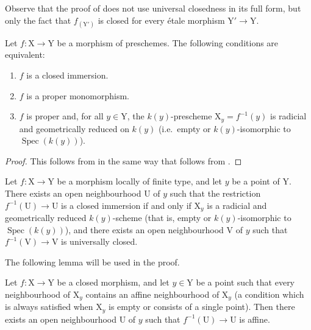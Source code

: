 \begin{remark}[18.12.5]
\label{IV.18.12.5}
Observe that the proof of  does not use universal closedness in its full form, but only the fact that $f_{(\mathrm{Y}')}$ is closed for every \'etale morphism $\mathrm{Y}'\to\mathrm{Y}$.
\end{remark}

\begin{corollary}[18.12.6]
\label{IV.18.12.6}
Let $f:\mathrm{X}\to\mathrm{Y}$ be a morphism of preschemes.
The following conditions are equivalent:
\begin{enumerate}[label=\alph*)]
  \item $f$ is a closed immersion.
  \item $f$ is a proper monomorphism.
  \item $f$ is proper and, for all $y\in\mathrm{Y}$, the $k(y)$-prescheme $\mathrm{X}_y=f^{-1}(y)$ is radicial and geometrically reduced on $k(y)$ (i.e.\ empty or $k(y)$-isomorphic to $\operatorname{Spec}(k(y))$).
\end{enumerate}
\end{corollary}

\begin{proof}
This follows from  in the same way that  follows from .
\end{proof}

\begin{proposition}[18.12.7]
\label{IV.18.12.7}
Let $f:\mathrm{X}\to\mathrm{Y}$ be a morphism locally of finite type, and let $y$ be a point of $\mathrm{Y}$.
There exists an open neighbourhood $\mathrm{U}$ of $y$ such that the restriction $f^{-1}(\mathrm{U})\to\mathrm{U}$ is a closed immersion if and only if $\mathrm{X}_y$ is a radicial and geometrically reduced $k(y)$-scheme (that is, empty or $k(y)$-isomorphic to $\operatorname{Spec}(k(y))$), and there exists an open neighbourhood $\mathrm{V}$ of $y$ such that $f^{-1}(\mathrm{V})\to\mathrm{V}$ is universally closed.
\end{proposition}

The following lemma will be used in the proof.

\begin{lemma}[18.12.7.1]
\label{IV.18.12.7.1}
Let $f:\mathrm{X}\to\mathrm{Y}$ be a closed morphism, and let $y\in\mathrm{Y}$ be a point such that every neighbourhood of $\mathrm{X}_y$ contains an affine neighbourhood of $\mathrm{X}_y$ (a condition which is always satisfied when $\mathrm{X}_y$ is empty or consists of a single point).
Then there exists an open neighbourhood $\mathrm{U}$ of $y$ such that $f^{-1}(\mathrm{U})\to\mathrm{U}$ is affine.
\end{lemma}

